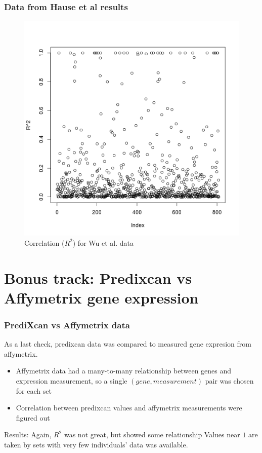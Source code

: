 \documentclass{beamer}
\begin{document}
  \begin{frame}
    \frametitle{Data from Hause et al results}
    \begin{center}
      \begin{figure}
      \includegraphics[scale=0.3]{../Out/wu-mrna-protein-r-squared.png}
      \caption{Correlation ($R^2$) for Wu et al. data}
      \end{figure}
    \end{center}
  \end{frame}

  \section{Bonus track: Predixcan vs Affymetrix gene expression}
  \begin{frame}
    \frametitle{PrediXcan vs Affymetrix data}
    As a last check, predixcan data was compared to measured gene expresion from affymetrix.
    \begin{itemize}
      \item
      Affymetrix data had a many-to-many relationship between genes and expression measurement, so a single $(gene,measurement)$ pair was chosen for each set
      \item
      Correlation between predixcan values and affymetrix measurements were figured out
    \end{itemize}
    \vskip15pt
    Results:
    Again, $R^2$ was not great, but showed some relationship
    Values near $1$ are taken by sets with very few individuals' data was available.
  \end{frame}
  
\end{document}
